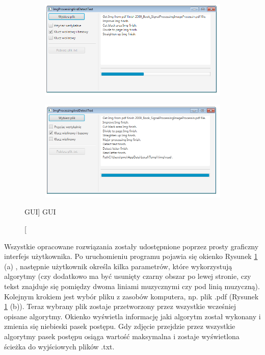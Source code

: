 \documentclass[a4paper,12pt]{article}
\begin{document}
\begin{figure}[h!]
				\begin{subfigure}[b]{0.47\linewidth}
                    \includegraphics[width=\linewidth]{image//gui//app003.png}
					\caption{}
                \end{subfigure}
                \begin{subfigure}[b]{0.47\linewidth}
                    \includegraphics[width=\linewidth]{image//gui//app004.png}
					\caption{}
                \end{subfigure}
                \caption
                    [GUI]
					{GUI}
					\label{fig:gui}
            \end{figure}
            
             Wszystkie opracowane rozwiązania zostały udostępnione poprzez prosty graficzny interfejs użytkownika. Po uruchomieniu programu pojawia się okienko Rysunek \ref{fig:gui} (a) , następnie  użytkownik określa kilka parametrów, które wykorzystują algorytmy (czy dodatkowo ma być usunięty czarny obszar po lewej stronie, czy tekst znajduje się pomiędzy dwoma liniami muzycznymi czy pod linią muzyczną). Kolejnym krokiem jest wybór pliku z zasobów komputera, np. plik .pdf (Rysunek \ref{fig:gui} (b)). Teraz wybrany plik zostaje przetworzony przez wszystkie wcześniej opisane algorytmy. Okienko wyświetla informację jaki algorytm został wykonany i zmienia się niebieski pasek postępu. Gdy zdjęcie przejdzie przez wszystkie algorytmy pasek postępu osiąga wartość maksymalna i zostaje wyświetlona ścieżka do wyjściowych plików .txt.
	        
\end{document}
